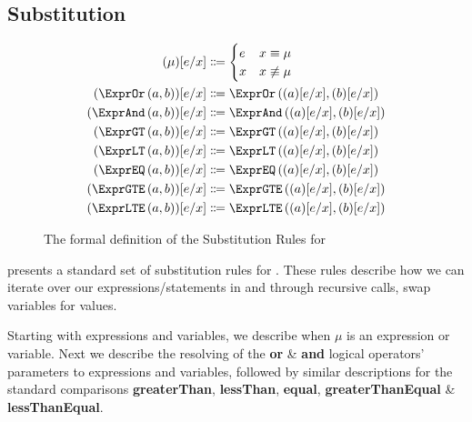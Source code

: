 \subsection{Substitution}
\label{subsec:substitution}

\begin{figure}[ht]
  \centering
\begin{align*}
  \subst{\mu}{e}{x}
  &
    \Coloneqq
    \begin{cases}
      e&x\equiv\mu\\
      x&x\not\equiv\mu\\
    \end{cases}
  \\
  \subst{\exprOr{a}{b}}{e}{x}&\Coloneqq\exprOr{\subst{a}{e}{x}}{\subst{b}{e}{x}}\\
  \subst{\exprAnd{a}{b}}{e}{x}&\Coloneqq\exprAnd{\subst{a}{e}{x}}{\subst{b}{e}{x}}\\
  \subst{\exprGT{a}{b}}{e}{x}&\Coloneqq\exprGT{\subst{a}{e}{x}}{\subst{b}{e}{x}}\\
  \subst{\exprLT{a}{b}}{e}{x}&\Coloneqq\exprLT{\subst{a}{e}{x}}{\subst{b}{e}{x}}\\
  \subst{\exprEQ{a}{b}}{e}{x}&\Coloneqq\exprEQ{\subst{a}{e}{x}}{\subst{b}{e}{x}}\\
  \subst{\exprGTE{a}{b}}{e}{x}&\Coloneqq\exprGTE{\subst{a}{e}{x}}{\subst{b}{e}{x}}\\
  \subst{\exprLTE{a}{b}}{e}{x}&\Coloneqq\exprLTE{\subst{a}{e}{x}}{\subst{b}{e}{x}}
\end{align*}
  \caption{\label{fig:subst}The formal definition of the Substitution Rules for \thePolicyLang}
\end{figure}

 presents a standard set of substitution rules for \thePolicyLang.
These rules describe how we can iterate over our expressions/statements in \thePolicyLang and through recursive calls, swap variables for values.

Starting with expressions and variables, we describe when $\mu$ is an expression or variable. Next we describe the resolving of the \textbf{or} \& \textbf{and} logical operators' parameters to expressions and variables, followed by similar descriptions for the standard comparisons \textbf{greaterThan}, \textbf{lessThan}, \textbf{equal}, \textbf{greaterThanEqual} \& \textbf{lessThanEqual}.
